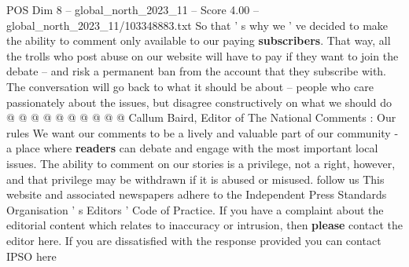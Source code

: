 \begin{textsample}{POS Dim 8 – global\_north\_2023\_11 – Score 4.00 – global\_north\_2023\_11/103348883.txt}
So that ' s why we ' ve decided to make the ability to comment only available to our paying \textbf{subscribers}.
That way, all the trolls who post abuse on our website will have to pay if they want to join the debate -- and risk a permanent ban from the account that they subscribe with.
The conversation will go back to what it should be about -- people who care passionately about the issues, but disagree constructively on what we should do @ @ @ @ @ @ @ @ @ @ Callum Baird, Editor of The National Comments : Our rules We want our comments to be a lively and valuable part of our community - a place where \textbf{readers} can debate and engage with the most important local issues.
The ability to comment on our stories is a privilege, not a right, however, and that privilege may be withdrawn if it is abused or misused. follow us This website and associated newspapers adhere to the Independent Press Standards Organisation ' s Editors ' Code of Practice.
If you have a complaint about the editorial content which relates to inaccuracy or intrusion, then \textbf{please} contact the editor here.
If you are dissatisfied with the response provided you can contact IPSO here

\end{textsample}
